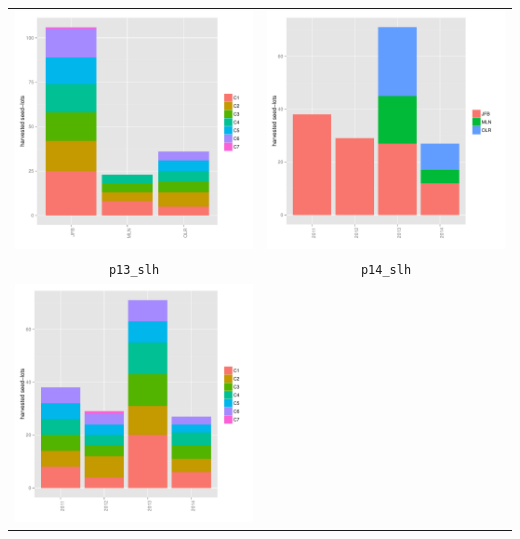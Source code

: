\documentclass{article}\usepackage[]{graphicx}\usepackage[]{color}
\newenvironment{knitrout}{}{} %
\begin{document}
\begin{itemize}
\begin{center}
\begin{tabular}{cc}
\begin{knitrout}
{\centering \includegraphics[width=.4\textwidth]{figures/shinemas2R_unnamed-chunk-35-1} 

}



\end{knitrout}
&
\begin{knitrout}
\definecolor{shadecolor}{rgb}{0.969, 0.969, 0.969}\color{fgcolor}

{\centering \includegraphics[width=.4\textwidth]{figures/shinemas2R_unnamed-chunk-36-1} 

}



\end{knitrout}
\\
\texttt{p13\_slh} & \texttt{p14\_slh} \\
\begin{knitrout}
\definecolor{shadecolor}{rgb}{0.969, 0.969, 0.969}\color{fgcolor}

{\centering \includegraphics[width=.4\textwidth]{figures/shinemas2R_unnamed-chunk-37-1} 

}
\end{knitrout}
\end{tabular}
\end{center}
\end{itemize}
\end{document}
